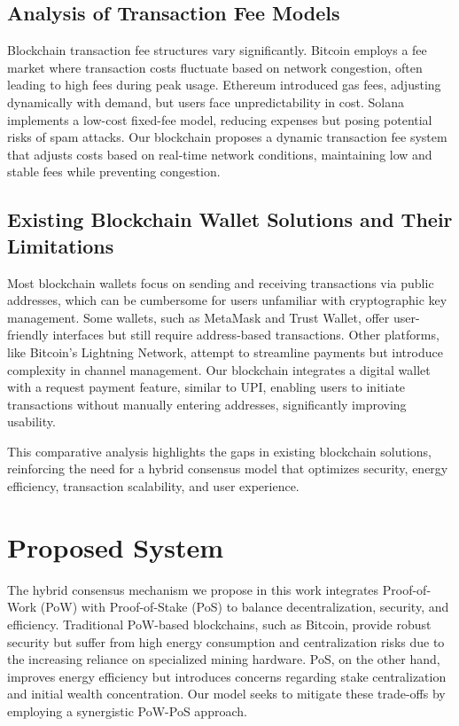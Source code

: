 \documentclass[conference]{IEEEtran}
\begin{document}
\subsection{Analysis of Transaction Fee Models}
Blockchain transaction fee structures vary significantly. Bitcoin employs a fee market where transaction costs fluctuate based on network congestion, often leading to high fees during peak usage. Ethereum introduced gas fees, adjusting dynamically with demand, but users face unpredictability in cost. Solana implements a low-cost fixed-fee model, reducing expenses but posing potential risks of spam attacks. Our blockchain proposes a dynamic transaction fee system that adjusts costs based on real-time network conditions, maintaining low and stable fees while preventing congestion.

\subsection{Existing Blockchain Wallet Solutions and Their Limitations}
Most blockchain wallets focus on sending and receiving transactions via public addresses, which can be cumbersome for users unfamiliar with cryptographic key management. Some wallets, such as MetaMask and Trust Wallet, offer user-friendly interfaces but still require address-based transactions. Other platforms, like Bitcoin’s Lightning Network, attempt to streamline payments but introduce complexity in channel management. Our blockchain integrates a digital wallet with a request payment feature, similar to UPI, enabling users to initiate transactions without manually entering addresses, significantly improving usability.

This comparative analysis highlights the gaps in existing blockchain solutions, reinforcing the need for a hybrid consensus model that optimizes security, energy efficiency, transaction scalability, and user experience.



\section{Proposed System}

The hybrid consensus mechanism we propose in this work integrates Proof-of-Work (PoW) with Proof-of-Stake (PoS) to balance decentralization, security, and efficiency. Traditional PoW-based blockchains, such as Bitcoin, provide robust security but suffer from high energy consumption and centralization risks due to the increasing reliance on specialized mining hardware. PoS, on the other hand, improves energy efficiency but introduces concerns regarding stake centralization and initial wealth concentration. Our model seeks to mitigate these trade-offs by employing a synergistic PoW-PoS approach.
\end{document}
